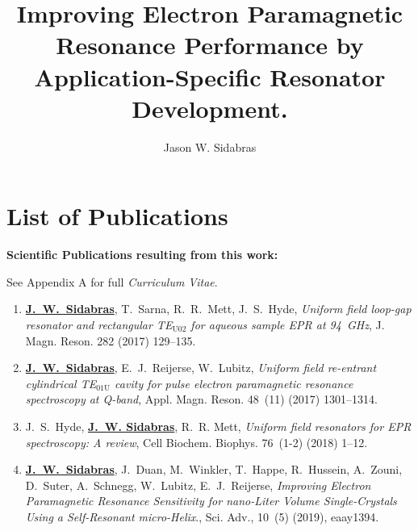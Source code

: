\documentclass[11pt,a4paper,openany,twoside,english,titlepage=true]{scrbook}
\author{Jason W. Sidabras}
\title{Improving Electron Paramagnetic Resonance Performance by Application-Specific Resonator Development.}
\begin{document}
\raggedbottom
{}

\maketitle






\newpage

\chapter*{List of Publications}

\textbf{Scientific Publications resulting from this work: }

See Appendix A for full \textit{Curriculum Vitae}.
\begin{enumerate}
\itemsep0em
    \item \textbf{\underline{J.~W.~Sidabras}}, T.~Sarna, R.~R.~Mett, J.~S.~Hyde, {\em Uniform field loop-gap
  resonator and rectangular {TE}$_{\text{{U}02}}$ for aqueous sample {EPR} at 94~{GHz}}, J. Magn. Reson. 282 (2017) 129--135.
    \item \textbf{\underline{J.~W.~Sidabras}}, E.~J.~Reijerse, W.~Lubitz, {\em Uniform field re-entrant cylindrical
  {TE}$_{\text{01{U}}}$ cavity for pulse electron paramagnetic resonance spectroscopy at {Q}-band}, Appl. Magn. Reson. 48~(11) (2017) 1301--1314.
    \item J.~S.~Hyde, \textbf{\underline{J.~W. Sidabras}}, R.~R. Mett, {\em Uniform field resonators for {EPR}
  spectroscopy: A review}, Cell Biochem. Biophys. 76~(1-2) (2018) 1--12.
    \item \textbf{\underline{J.~W.~Sidabras}}, J.~Duan, M.~Winkler, T.~Happe, R.~Hussein, A.~Zouni, D.~Suter,
  A.~Schnegg, W.~Lubitz, E.~J.~Reijerse, {\em Improving Electron Paramagnetic Resonance Sensitivity for nano-Liter Volume Single-Crystals Using a Self-Resonant micro-Helix}., Sci. Adv., 10~(5) (2019), eaay1394.
\end{enumerate}

\newpage
\makeatletter
\renewcommand{\@pnumwidth}{1.75em} 
\renewcommand{\@tocrmarg}{2em}
\makeatother
\tableofcontents\newpage
\end{document}

